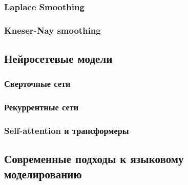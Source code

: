 \subsubsection{Laplace Smoothing}

\subsubsection{Kneser-Nay smoothing}

\subsection{Нейросетевые модели}
\label{sub:domain:neural}



\subsubsection{Сверточные сети}

\subsubsection{Рекуррентные сети}

\subsubsection{Self-attention и трансформеры}

\subsection{Современные подходы к языковому моделированию}
\label{sub:domain:curr}

